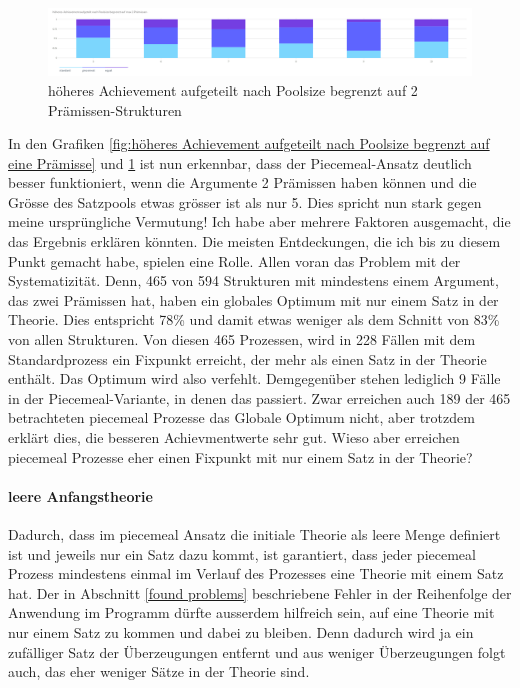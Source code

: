\documentclass{article}
\begin{document}
\begin{figure}[ht]
  \centering
  \includegraphics[width=\textwidth]{höheres Achievement aufgeteilt nach Poolsize begrenzt auf max 2 Prämissen}
  \caption{höheres Achievement aufgeteilt nach Poolsize begrenzt auf 2 Prämissen-Strukturen\label{fig:höheres Achievement aufgeteilt nach Poolsize begrenzt auf max 2 Prämissen}}
\end{figure}

In den Grafiken \ref{fig:höheres Achievement aufgeteilt nach Poolsize begrenzt auf eine Prämisse} und \ref{fig:höheres Achievement aufgeteilt nach Poolsize begrenzt auf max 2 Prämissen} ist nun erkennbar, dass der Piecemeal-Ansatz deutlich besser funktioniert, wenn die Argumente 2 Prämissen haben können und die Grösse des Satzpools etwas grösser ist als nur 5. Dies spricht nun stark gegen meine ursprüngliche Vermutung! Ich habe aber mehrere Faktoren ausgemacht, die das Ergebnis erklären könnten. Die meisten Entdeckungen, die ich bis zu diesem Punkt gemacht habe, spielen eine Rolle. Allen voran das Problem mit der Systematizität. Denn, 465 von 594 Strukturen mit mindestens einem Argument, das zwei Prämissen hat, haben ein globales Optimum mit nur einem Satz in der Theorie. Dies entspricht 78\% und damit etwas weniger als dem Schnitt von 83\% von allen Strukturen. Von diesen 465 Prozessen, wird in 228 Fällen mit dem Standardprozess ein Fixpunkt erreicht, der mehr als einen Satz in der Theorie enthält. Das Optimum wird also verfehlt. Demgegenüber stehen lediglich 9 Fälle in der Piecemeal-Variante, in denen das passiert. Zwar erreichen auch 189 der 465 betrachteten piecemeal Prozesse das Globale Optimum nicht, aber trotzdem erklärt dies, die besseren Achievmentwerte sehr gut. Wieso aber erreichen piecemeal Prozesse eher einen Fixpunkt mit nur einem Satz in der Theorie?

\paragraph{leere Anfangstheorie} Dadurch, dass im piecemeal Ansatz die initiale Theorie als leere Menge definiert ist und jeweils nur ein Satz dazu kommt, ist garantiert, dass jeder piecemeal Prozess mindestens einmal im Verlauf des Prozesses eine Theorie mit einem Satz hat. Der in Abschnitt \ref{found problems} beschriebene Fehler in der Reihenfolge der Anwendung im Programm dürfte ausserdem hilfreich sein, auf eine Theorie mit nur einem Satz zu kommen und dabei zu bleiben. Denn dadurch wird ja ein zufälliger Satz der Überzeugungen entfernt und aus weniger Überzeugungen folgt auch, das eher weniger Sätze in der Theorie sind.
\end{document}

